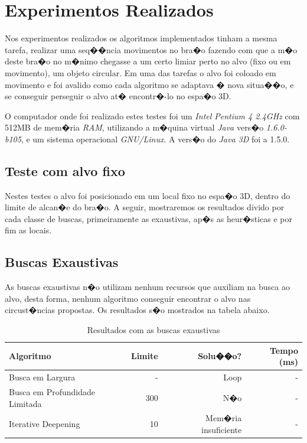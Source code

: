 \documentclass[12pt]{article}
\begin{document}
\section{Experimentos Realizados}

Nos experimentos realizados os algoritmos implementados tinham a mesma tarefa, realizar uma seq��ncia movimentos no bra�o fazendo com que a m�o deste bra�o no m�nimo chegasse a um certo limiar perto no alvo (fixo ou em movimento), um objeto circular. Em uma das tarefas o alvo foi coloado em movimento e foi avalido como cada algoritmo se adaptava � nova situa��o, e se conseguir perseguir o alvo at� encontr�-lo no espa�o 3D.

O computador onde foi realizado estes testes foi um \textit{Intel Pentium 4 2.4GHz} com 512MB de mem�ria \textit{RAM}, utilizando a m�quina virtual \textit{Java} vers�o \textit{1.6.0-b105}, e um sistema operacional \textit{GNU/Linux}. A vers�o do \textit{Java 3D} foi a 1.5.0.

\subsection{Teste com alvo fixo}

Nestes testes o alvo foi posicionado em um local fixo no espa�o 3D, dentro do limite de alcan�e do bra�o. A seguir, mostraremos os resultados divido por cada classe de buscas, primeiramente as exaustivas, ap�s as heur�sticas e por fim as locais.

\subsection{Buscas Exaustivas}

As buscas exaustivas n�o utilizam nenhum recursos que auxiliam na busca ao alvo, desta forma, nenhum algoritmo conseguir encontrar o alvo nas circust�ncias propostas. Os resultados s�o mostrados na tabela abaixo.

\begin{table}[!th]
 \begin{center}
  \caption{Resultados com as buscas exaustivas}
  \begin{tabular}{|l|r|r|r|}
    \hline
        Algoritmo 						& Limite  	& Solu��o? 					& Tempo (ms) 	\\ \hline
        Busca em Largura 				& - 	  	& Loop 						& -				\\ \hline
        Busca em Profundidade Limitada 	& 300 		& N�o						& -			\\ \hline
		Iterative Deepening				& 10 		& Mem�ria insuficiente		& -			\\ \hline
  \end{tabular}
  \label{table:tabela1}
 \end{center}
\end{table}
\end{document}
